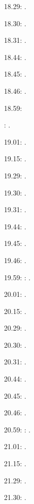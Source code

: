 \documentclass[italian]{article}
\begin{document}
18.29:     . 

18.30:     .

18.31:     .

18.44:     .

18.45:     .

18.46:     .

18.59:     

:    .

19.01:     . 

19.15:     . 

19.29:     . 

19.30:     .

19.31:     .

19.44:     .

19.45:     .

19.46:     .

19.59:     
:    .

20.01:     . 

20.15:     . 

20.29:     . 

20.30:     .

20.31:     .

20.44:     .

20.45:     .

20.46:     .

20.59:     
:    .

21.01:     . 

21.15:     . 

21.29:     . 

21.30:     .
\end{document}
